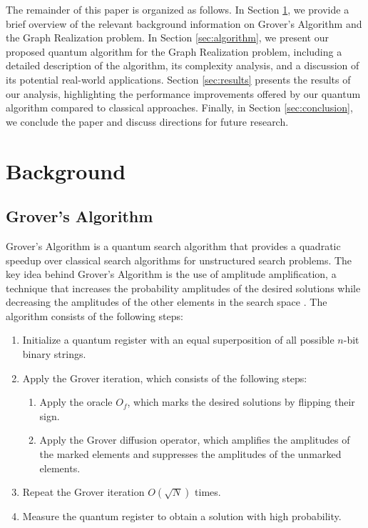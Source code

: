 The remainder of this paper is organized as follows. In Section \ref{sec:background}, we provide a brief overview of the relevant background information on Grover's Algorithm and the Graph Realization problem. In Section \ref{sec:algorithm}, we present our proposed quantum algorithm for the Graph Realization problem, including a detailed description of the algorithm, its complexity analysis, and a discussion of its potential real-world applications. Section \ref{sec:results} presents the results of our analysis, highlighting the performance improvements offered by our quantum algorithm compared to classical approaches. Finally, in Section \ref{sec:conclusion}, we conclude the paper and discuss directions for future research.

\section{Background}
\label{sec:background}

\subsection{Grover's Algorithm}

Grover's Algorithm is a quantum search algorithm that provides a quadratic speedup over classical search algorithms for unstructured search problems. The key idea behind Grover's Algorithm is the use of amplitude amplification, a technique that increases the probability amplitudes of the desired solutions while decreasing the amplitudes of the other elements in the search space \cite{grover1996fast}. The algorithm consists of the following steps:

\begin{enumerate}
  \item Initialize a quantum register with an equal superposition of all possible $n$-bit binary strings.
  \item Apply the Grover iteration, which consists of the following steps:
  \begin{enumerate}
    \item Apply the oracle $O_f$, which marks the desired solutions by flipping their sign.
    \item Apply the Grover diffusion operator, which amplifies the amplitudes of the marked elements and suppresses the amplitudes of the unmarked elements.
  \end{enumerate}
  \item Repeat the Grover iteration $O(\sqrt{N})$ times.
  \item Measure the quantum register to obtain a solution with high probability.
\end{enumerate}

